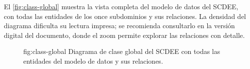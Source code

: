 El \cref{fig:class-global} muestra la vista completa del modelo de
datos del SCDEE, con todas las entidades de los once subdominios y sus
relaciones. La densidad del diagrama dificulta su lectura impresa; se
recomienda consultarlo en la versión digital del documento, donde el
zoom permite explorar las relaciones con detalle.

\begin{figure}[Diagrama de clase global del SCDEE]%
              {fig:class-global}%
              {Diagrama de clase global del SCDEE con todas las
               entidades del modelo de datos y sus relaciones.}
\end{figure}
